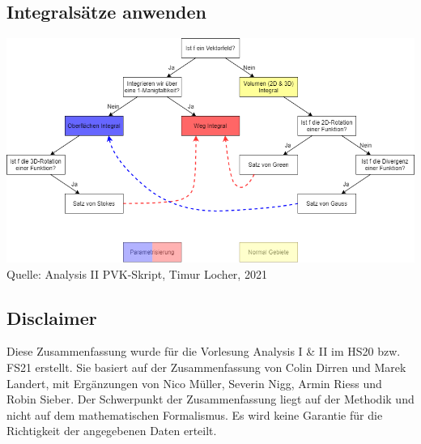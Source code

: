\documentclass[8pt, a4paper, landscape, fleqn]{scrartcl}
\begin{document}
\begin{multicols*}{3}
		\subsection{Integralsätze anwenden}
		    \includegraphics[scale=0.55, angle=270]{IntegralTree.png}
		    \tiny{Quelle: Analysis II PVK-Skript, Timur Locher, 2021}\\
		    \normalsize
	    \subsection{Disclaimer}
			Diese Zusammenfassung wurde für die Vorlesung Analysis I \& II im HS20 bzw. FS21 erstellt. Sie basiert auf der Zusammenfassung von Colin Dirren und Marek Landert, mit Ergänzungen von Nico Müller, Severin Nigg, Armin Riess und Robin Sieber. Der Schwerpunkt der Zusammenfassung liegt auf der Methodik und nicht auf dem mathematischen Formalismus. Es wird keine Garantie für die Richtigkeit der angegebenen Daten erteilt.
	\end{multicols*} 
\end{document}
